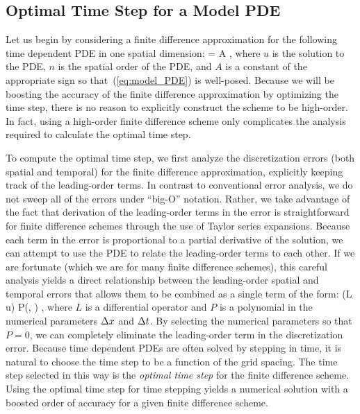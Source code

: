 \documentclass[oneeqnum,onefignum,onetabnum,onethmnum]{siamltex}
\begin{document}
\subsection{\label{sec:ots_model_pde} 
            Optimal Time Step for a Model PDE}
Let us begin by considering a finite difference approximation for the
following time dependent PDE in one spatial dimension: 
\beq
   = A ,
  \label{eq:model_PDE}
\eeq
where $u$ is the solution to the PDE, $n$ is the spatial order of the 
PDE, and $A$ is a constant of the appropriate sign so that~(\ref{eq:model_PDE}) 
is well-posed.  Because we will be boosting the accuracy of the finite 
difference approximation by optimizing the time step, there is no reason to 
explicitly construct the scheme to be high-order.  In fact, using a high-order 
finite difference scheme only complicates the analysis required to calculate 
the optimal time step.  

To compute the optimal time step, we first analyze the discretization errors 
(both spatial and temporal) for the finite difference approximation, 
explicitly keeping track of the leading-order terms.  In contrast to 
conventional error analysis, we do not sweep all of the errors under ``big-O'' 
notation.  Rather, we take advantage of the fact that derivation of the 
leading-order terms in the error is straightforward for finite difference
schemes through the use of Taylor series expansions.  Because each term in 
the error is proportional to a partial derivative of the solution, we can 
attempt to use the PDE to relate the leading-order terms to each other.  If we 
are fortunate (which we are for many finite difference schemes), this careful 
analysis yields a direct relationship between the leading-order spatial and 
temporal errors that allows them to be combined as a single term of the form:
\beq
  (L u) P(\dx, \dt) ,
  \label{eq:leading_order_error_model_PDE_general}
\eeq
where $L$ is a differential operator and $P$ is a polynomial in the numerical 
parameters $\Delta x$ and $\Delta t$.  By selecting the numerical parameters so that 
$P = 0$, we can completely eliminate the leading-order term in the 
discretization error.  Because time dependent PDEs are often solved by 
stepping in time, it is natural to choose the time step to be a function of 
the grid spacing.  The time step selected in this way is the
\emph{optimal time step} for the finite difference scheme.  Using the optimal
time step for time stepping yields a numerical solution with a boosted order 
of accuracy for a given finite difference scheme.
\end{document}
